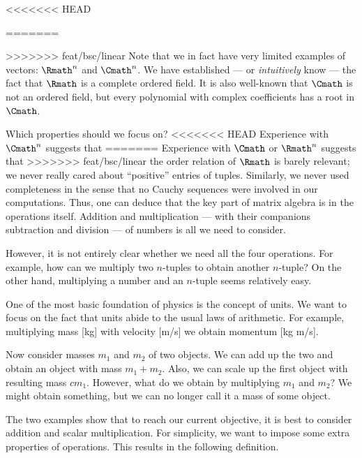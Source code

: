 <<<<<<< HEAD
\begin{example}
=======
\begin{example}
>>>>>>> feat/bsc/linear
    \label{exm:vspintro}
    Note that we in fact have very limited examples of vectors:
    \(\Rmath^n\) and \(\Cmath^n\).
    We have established
    --- or \emph{intuitively} know ---
    the fact that \(\Rmath\) is a complete ordered field.
    It is also well-known that
    \(\Cmath\) is not an ordered field,
    but every polynomial with complex coefficients
    has a root in \(\Cmath\).

    Which properties should we focus on?
<<<<<<< HEAD
    Experience with \(\Cmath^n\) suggests that
=======
    Experience with \(\Cmath\) or \(\Rmath^n\) suggests that
>>>>>>> feat/bsc/linear
    the order relation of \(\Rmath\) is barely relevant;
    we never really cared about ``positive'' entries of tuples.
    Similarly, we never used completeness in the sense that
    no Cauchy sequences were involved in our computations.
    Thus, one can deduce that
    the key part of matrix algebra is in the operations itself.
    Addition and multiplication
    --- with their companions subtraction and division ---
    of numbers is all we need to consider.

    However, it is not entirely clear whether
    we need all the four operations.
    For example, how can we multiply two \(n\)-tuples
    to obtain another \(n\)-tuple?
    On the other hand,
    multiplying a number and an \(n\)-tuple seems relatively easy.
\end{example}

\begin{example}
    \label{exm:vspintro2}
    One of the most basic foundation of physics is the concept of units.
    We want to focus on the fact that
    units abide to the usual laws of arithmetic.
    For example, multiplying mass [kg] with velocity [m/s]
    we obtain momentum [kg m/s].

    Now consider masses \(m_1\) and \(m_2\) of two objects.
    We can add up the two and obtain an object with mass \(m_1+m_2\).
    Also, we can scale up the first object with resulting mass \(cm_1\).
    However, what do we obtain by multiplying \(m_1\) and \(m_2\)?
    We might obtain something,
    but we can no longer call it a mass of some object.
\end{example}

The two examples show that
to reach our current objective,
it is best to consider addition and scalar multiplication.
For simplicity, we want to impose some extra properties of operations.
This results in the following definition.


\end{example}
